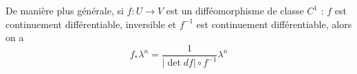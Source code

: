 \begin{theo}
    De manière plus générale, si $f:U\to V$ est un difféomorphisme de classe $C^1$ : $f$ est continuement différentiable, inversible et $f^{-1}$ est continuement différentiable, alors on a
    \begin{equation*}
        f_*\lambda^n = \frac{1}{|\det df|\circ f^{-1}}\lambda^n
    \end{equation*}
\end{theo}